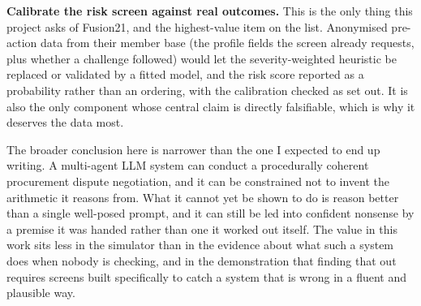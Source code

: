 \textbf{Calibrate the risk screen against real outcomes.} This is the only thing
this project asks of Fusion21, and the highest-value item on the list. Anonymised
pre-action data from their member base (the profile fields the screen already
requests, plus whether a challenge followed) would let the severity-weighted
heuristic be replaced or validated by a fitted model, and the risk score reported
as a probability rather than an ordering, with the calibration checked as
\citet{guo2017calibration} set out. It is also the only component whose central
claim is directly falsifiable, which is why it deserves the data most.

The broader conclusion here is narrower than the one I expected to end up
writing. A multi-agent LLM system can conduct a procedurally coherent
procurement dispute negotiation, and it can be constrained not to invent the
arithmetic it reasons from. What it cannot yet be shown to do is reason better
than a single well-posed prompt, and it can still be led into confident nonsense
by a premise it was handed rather than one it worked out itself. The
value in this work sits less in the simulator than in the evidence about what
such a system does when nobody is checking, and in the demonstration that
finding that out requires screens built specifically to catch a system that is
wrong in a fluent and plausible way.